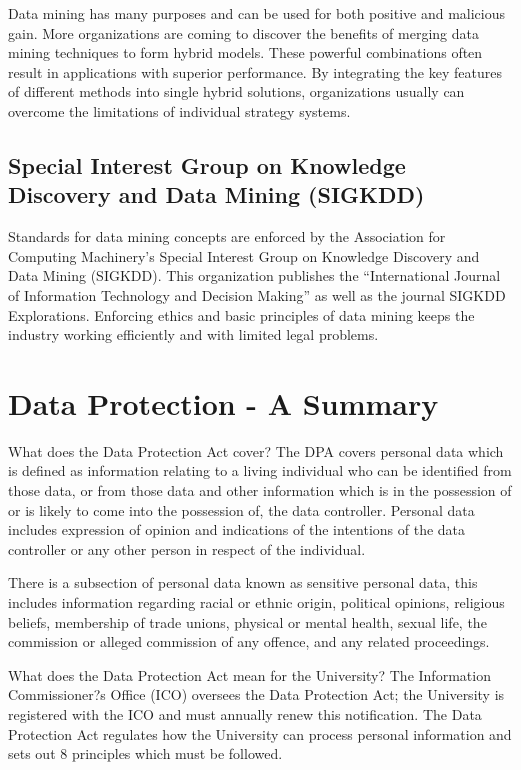 \documentclass[11pt]{article} %
\begin{document}
Data mining has many purposes and can be used for both positive and malicious gain. More organizations are coming to discover the benefits of merging data mining techniques to form hybrid models. These powerful combinations often result in applications with superior performance. By integrating the key features of different methods into single hybrid solutions, organizations usually can overcome the limitations of individual strategy systems.




\subsection{Special Interest Group on Knowledge Discovery and Data Mining (SIGKDD)}

Standards for data mining concepts are enforced by the Association for Computing Machinery's Special Interest Group on Knowledge Discovery and Data Mining (SIGKDD). This organization publishes the “International Journal of Information Technology and Decision Making” as well as the journal SIGKDD Explorations. Enforcing ethics and basic principles of data mining keeps the industry working efficiently and with limited legal problems.

\section{Data Protection - A Summary}
What does the Data Protection Act cover?
The DPA covers personal data which is defined as information relating to a living individual who can be identified from those data, or from those data and other information which is in the possession of or is likely to come into the possession of, the data controller.  Personal data includes expression of opinion and indications of the intentions of the data controller or any other person in respect of the individual.

There is a subsection of personal data known as sensitive personal data, this includes information regarding racial or ethnic origin, political opinions, religious beliefs, membership of trade unions, physical or mental health, sexual life, the commission or alleged commission of any offence, and any related proceedings.

What does the Data Protection Act mean for the University?
The Information Commissioner?s Office (ICO) oversees the Data Protection Act; the University is registered with the ICO and must annually renew this notification.  The Data Protection Act regulates how the University can process personal information and sets out 8 principles which must be followed.
\end{document}
